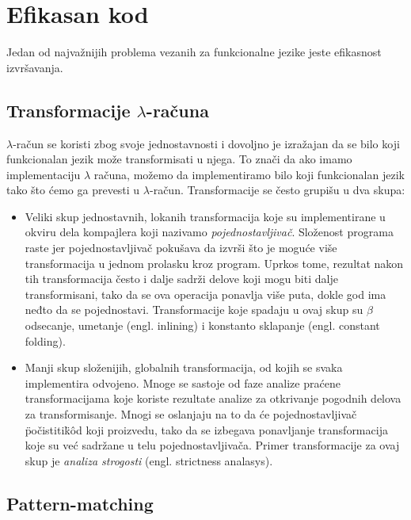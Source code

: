 \section{Efikasan kod}


Jedan od najvažnijih problema vezanih za funkcionalne jezike jeste efikasnost izvršavanja. 
	

\subsection{Transformacije $\lambda$-računa}

$\lambda$-račun se koristi zbog svoje jednostavnosti i dovoljno je izražajan da se bilo koji funkcionalan jezik može transformisati u njega. To znači da ako imamo implementaciju $\lambda$ računa, možemo da implementiramo  bilo koji funkcionalan jezik tako što ćemo ga prevesti u $\lambda$-račun. Transformacije se često grupišu u dva skupa:


\begin{itemize}
	\item Veliki skup jednostavnih, lokanih transformacija koje su implementirane u okviru dela kompajlera koji nazivamo \textit{pojednostavljivač}. Složenost programa raste jer pojednostavljivač pokušava da izvrši što je moguće više transformacija u jednom prolasku kroz program. Uprkos tome, rezultat nakon tih transformacija često i dalje sadrži delove koji mogu biti dalje transformisani, tako da se ova operacija ponavlja više puta, dokle god ima neđto da se pojednostavi. Transformacije koje spadaju u ovaj skup su $\beta$ odsecanje, umetanje (engl. inlining) i konstanto sklapanje (engl. constant folding).
	
	\item Manji skup složenijih, globalnih transformacija, od kojih se svaka implementira odvojeno. Mnoge se sastoje od faze analize praćene transformacijama koje koriste rezultate analize za otkrivanje pogodnih delova za transformisanje. Mnogi se oslanjaju na to da će pojednostavljivač \"počistiti\" k\^ od koji proizvedu, tako da se izbegava ponavljanje transformacija koje su već sadržane u telu pojednostavljivača. Primer transformacije za ovaj skup je  \textit{analiza strogosti} (engl. strictness analasys). 
	
\end{itemize}
  

\subsection{Pattern-matching}

